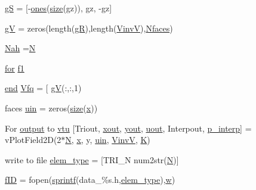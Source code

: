 \begin{DoxyCompactItemize}
\item 
\hyperlink{a00473_a51eed178703fb32c103fbb5565b564f1}{gS} = \mbox{[}-\/\hyperlink{a00473_a6d4fbbd46e46569dab2b0ad8372e0220}{ones}(\hyperlink{a00611_ad6cb0afbbe6ea4f56407890be2533966}{size}(gz)), gz, -\/gz\mbox{]}
\item 
\hyperlink{a00473_a2a3aaeecb452e864ff43bf3a5050191a}{gV} = zeros(length(\hyperlink{a00473_acbf1a23eea93c85cd113589566865e49}{gR}),length(\hyperlink{a00473_a8ef32285093ff36729ef70bb1e8149c4}{VinvV}),\hyperlink{a00575_aac4846947deeade1c4227c400ab38c13}{Nfaces})
\item 
\hyperlink{a00473_ab1f1cc1af4dcd6977ad6edb607b3d704}{Nah} =\hyperlink{a00473_a5b9c4563028063ee53b517cce9aa701b}{N}
\item 
\hyperlink{a00623_ad1e7380d51df1e0043d24d3c8a860e0a}{for} \hyperlink{a00473_a47dc4ee2bceaf5a9f6d47cb10353a96f}{f1}
\item 
\hyperlink{a00608_afb358f48b1646c750fb9da6c6585be2b}{end} \hyperlink{a00473_ad06233c3cbd809b83fb292471e66fc78}{Vfq} = \mbox{[} \hyperlink{a00473_ab16464170b2d4f6a6b117aae1d91f963}{gV}(\+:,\+:,1)
\item 
faces \hyperlink{a00473_ab528855467ba0360924bbd0dd81edb35}{uin} = zeros(\hyperlink{a00611_ad6cb0afbbe6ea4f56407890be2533966}{size}(\hyperlink{a00605_ac98c3bb25378222646e977292011625f}{x}))
\item 
For \hyperlink{a00623_a934120182a1459d17613528940e2bc61}{output} to \hyperlink{a00473_af4c53a4aa4d5d3e1700b6e53de79a026}{vtu} \mbox{[}Triout, \hyperlink{a00563_aa43b7c30923e8fcf939fe12082a19359}{xout}, \hyperlink{a00563_a440aa7a05dec25dc6fe586eaa162395b}{yout}, \hyperlink{a00563_a5c8d8342682becd112eb9de226d6053f}{uout}, Interpout, \hyperlink{a00563_a08a5429e87fabfe926dd685750b12894}{p\+\_\+interp}\mbox{]} = v\+Plot\+Field2D(2$\ast$\hyperlink{a00473_a5b9c4563028063ee53b517cce9aa701b}{N}, \hyperlink{a00605_ac98c3bb25378222646e977292011625f}{x}, y, \hyperlink{a00473_ab528855467ba0360924bbd0dd81edb35}{uin}, \hyperlink{a00473_a8ef32285093ff36729ef70bb1e8149c4}{VinvV}, \hyperlink{a00608_a16e4ef534cec559430e07e05eb71c719}{K})
\item 
write to file \hyperlink{a00473_a9e84386471d07238c03b10507f58eba9}{elem\+\_\+type} = \mbox{[}\textquotesingle{}T\+R\+I\+\_\+N\textquotesingle{} num2str(\hyperlink{a00473_a5b9c4563028063ee53b517cce9aa701b}{N})\mbox{]}
\item 
\hyperlink{a00473_ae0527cbfd56392d5095a691bbf10ba5b}{f\+ID} = fopen(\hyperlink{a00575_ae6aab5c308faac0fc539cc9c6da9fbd0}{sprintf}(\textquotesingle{}data\+\_\+\%s.\+h\textquotesingle{},\hyperlink{a00473_a9e84386471d07238c03b10507f58eba9}{elem\+\_\+type}),\textquotesingle{}\hyperlink{a00605_aad57484016654da87125db86f4227ea3}{w}\textquotesingle{})

\end{DoxyCompactItemize}
